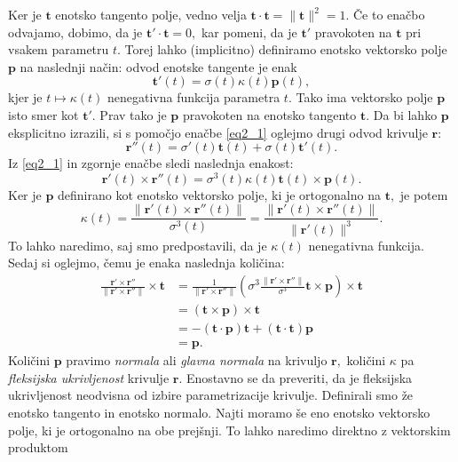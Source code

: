 \documentclass[12pt,a4paper,twoside]{article}
\theoremstyle{definition} %
\theoremstyle{plain} %
\theoremstyle{primerstyle}
\numberwithin{equation}{section}  %
\newcommand{\tV}{\mathbf{t}}
\newcommand{\pV}{\mathbf{p}}
\newcommand{\rV}{\mathbf{r}}
\begin{document}
Ker je $\tV$ enotsko tangento polje, vedno velja $\tV \cdot \tV=\lVert \tV \rVert^2 =1.$ Če to enačbo odvajamo, dobimo, da je $\tV' \cdot \tV=0,$ kar pomeni, da je $\tV'$ pravokoten na $\tV$ pri vsakem parametru $t.$ Torej lahko (implicitno) definiramo enotsko vektorsko polje $\pV$ na naslednji način: odvod enotske tangente je enak
\begin{equation}
	\label{eq2_5}
	\tV'(t)=\sigma(t)\kappa(t)\pV(t),
\end{equation}
kjer je $t\mapsto\kappa(t)$ nenegativna funkcija parametra $t.$ Tako ima vektorsko polje $\pV$ isto smer kot $\tV'.$ Prav tako je $\pV$ pravokoten na enotsko tangento $\tV.$ Da bi lahko $\pV$ eksplicitno izrazili, si s pomočjo enačbe \eqref{eq2_1} oglejmo drugi odvod krivulje $\rV$:
\begin{equation}
	\label{eq2_6}
	\rV''(t)=\sigma'(t)\tV(t)+\sigma(t)\tV'(t).
\end{equation}
Iz \eqref{eq2_1} in zgornje enačbe sledi naslednja enakost:
\begin{equation}
	\label{eq2_7}
	\rV'(t) \times \rV''(t)=\sigma^3(t)\kappa(t)\tV(t) \times \pV(t).
\end{equation}
Ker je $\pV$ definirano kot enotsko vektorsko polje, ki je ortogonalno na $\tV,$ je potem
\begin{equation}
	\label{kappa1}
	\kappa(t)=\frac{\lVert \rV'(t) \times \rV''(t) \rVert}{\sigma^3(t)}=\frac{\lVert \rV'(t) \times \rV''(t) \rVert}{\lVert \rV'(t) \rVert^3}.
\end{equation}
To lahko naredimo, saj smo predpostavili, da je $\kappa(t)$ nenegativna funkcija. Sedaj si oglejmo, čemu je enaka naslednja količina:
\begin{align}
	\frac{\rV'\times \rV''}{\lVert \rV'\times \rV'' \rVert} \times \tV &= \frac{1}{\lVert \rV'\times \rV'' \rVert} \left ( \sigma^3 \frac{\lVert \rV'\times \rV'' \rVert}{\sigma^3}\tV \times \pV\right ) \times \tV \nonumber \\
	&= (\tV \times \pV) \times \tV \nonumber \\
	&= -(\tV \cdot \pV)\tV + (\tV \cdot \tV)\pV \label{normala} \\
	&= \pV. \nonumber
\end{align}
Količini $\pV$ pravimo \textit{normala} ali \textit{glavna normala} na krivuljo $\rV,$ količini $\kappa$ pa \textit{fleksijska ukrivljenost} krivulje $\rV.$ Enostavno se da preveriti, da je fleksijska ukrivljenost neodvisna od izbire parametrizacije krivulje.
Definirali smo že enotsko tangento in enotsko normalo. Najti moramo še eno enotsko vektorsko polje, ki je ortogonalno na obe prejšnji. To lahko naredimo direktno z vektorskim produktom
\end{document}
